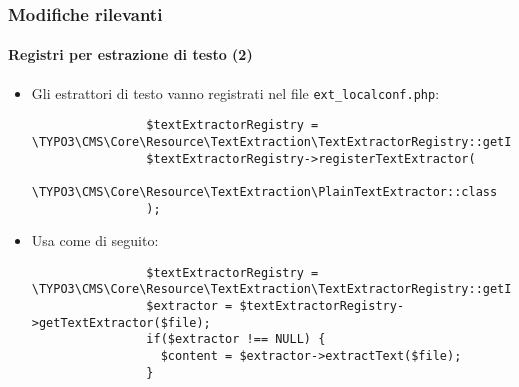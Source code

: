 \begin{frame}[fragile]
	\frametitle{Modifiche rilevanti}
	\framesubtitle{Registri per estrazione di testo (2)}

	\lstset{basicstyle=\tiny\ttfamily}

	\begin{itemize}

		\item Gli estrattori di testo vanno registrati nel file \texttt{ext\_localconf.php}:

			\begin{lstlisting}
				$textExtractorRegistry = \TYPO3\CMS\Core\Resource\TextExtraction\TextExtractorRegistry::getInstance();
				$textExtractorRegistry->registerTextExtractor(
				  \TYPO3\CMS\Core\Resource\TextExtraction\PlainTextExtractor::class
				);
			\end{lstlisting}

		\item Usa come di seguito:

			\begin{lstlisting}
				$textExtractorRegistry = \TYPO3\CMS\Core\Resource\TextExtraction\TextExtractorRegistry::getInstance();
				$extractor = $textExtractorRegistry->getTextExtractor($file);
				if($extractor !== NULL) {
				  $content = $extractor->extractText($file);
				}
			\end{lstlisting}
	\end{itemize}

\end{frame}


